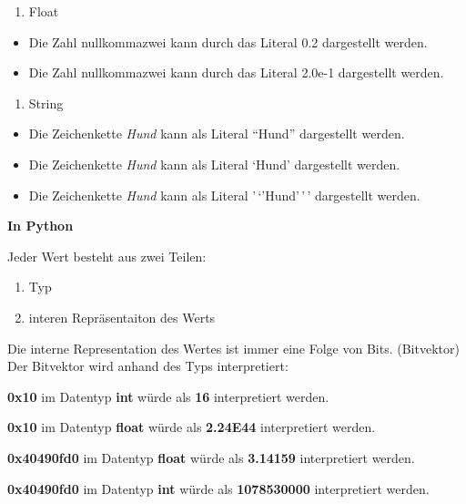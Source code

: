 \documentclass[
  11pt,
  a4paper,
  DIV=11,
  numbers=noendperiod]{scrartcl}
\providecommand{\tightlist}{%
  \setlength{\itemsep}{0pt}\setlength{\parskip}{0pt}}\usepackage{longtable,booktabs,array}
\begin{document}
\begin{enumerate}
\def\labelenumi{\arabic{enumi}.}
\setcounter{enumi}{1}
\tightlist
\item
  Float
\end{enumerate}

\begin{itemize}
\tightlist
\item
  Die Zahl nullkommazwei kann durch das Literal 0.2 dargestellt werden.
\item
  Die Zahl nullkommazwei kann durch das Literal 2.0e-1 dargestellt
  werden.
\end{itemize}

\begin{enumerate}
\def\labelenumi{\arabic{enumi}.}
\setcounter{enumi}{2}
\tightlist
\item
  String
\end{enumerate}

\begin{itemize}
\tightlist
\item
  Die Zeichenkette \emph{Hund} kann als Literal ``Hund'' dargestellt
  werden.
\item
  Die Zeichenkette \emph{Hund} kann als Literal `Hund' dargestellt
  werden.
\item
  Die Zeichenkette \emph{Hund} kann als Literal '\,`'Hund'\,'\,'
  dargestellt werden.
\end{itemize}

\textbf{In Python}

Jeder Wert besteht aus zwei Teilen:

\begin{enumerate}
\def\labelenumi{\alph{enumi})}
\item
  Typ
\item
  interen Repräsentaiton des Werts
\end{enumerate}

Die interne Representation des Wertes ist immer eine Folge von Bits.
(Bitvektor) Der Bitvektor wird anhand des Typs interpretiert:

\textbf{0x10} im Datentyp \textbf{int} würde als \textbf{16}
interpretiert werden.

\textbf{0x10} im Datentyp \textbf{float} würde als \textbf{2.24E44}
interpretiert werden.

\textbf{0x40490fd0} im Datentyp \textbf{float} würde als
\textbf{3.14159} interpretiert werden.

\textbf{0x40490fd0} im Datentyp \textbf{int} würde als
\textbf{1078530000} interpretiert werden.
\end{document}
